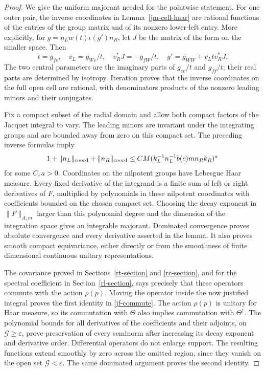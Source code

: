 \begin{proof}
We give the uniform majorant needed for the pointwise statement.
For one outer pair, the inverse coordinates in
Lemma~\ref{jm-cell-haar} are rational functions of the entries
of the group matrix and of its nonzero lower-left entry.
More explicitly, for
\(g=n_Lw(t)\iota(g')n_R\), let \(J\) be the matrix of
the form on the smaller space.  Then
\[
 t=g_{fe},\quad v_L=g_{We}/t,\quad
 v_R^*J=-g_{fW}/t,\quad
 g'=g_{WW}+v_Lt v_R^*J.
\]
The two central parameters are the imaginary parts of
\(g_{ee}/t\) and \(g_{ff}/t\); their real parts are
determined by isotropy.  Iteration proves that the inverse
coordinates on the full open cell are rational, with
denominators products of the nonzero leading minors and
their conjugates.

Fix a compact subset of the radial domain and allow both
compact factors of the Jacquet integral to vary.  The leading
minors are invariant under the integrating groups and are
bounded away from zero on this compact set.  The preceding
inverse formulas imply
\[
  1+\|n_L\|_{\rm coord}+\|n_R\|_{\rm coord}
              \leq C M(k_L^{-1}n_L^{-1}b(c)m n_Rk_R)^a
\]
for some \(C,a>0\).  Coordinates on the nilpotent groups
have Lebesgue Haar measure.  Every fixed derivative of the
integrand is a finite sum of left or right derivatives of
\(F\), multiplied by polynomials in these nilpotent
coordinates with coefficients bounded on the chosen compact
set.  Choosing the decay exponent in \(\|F\|_{A,m}\)
larger than this polynomial degree and the dimension of the
integration space gives an integrable majorant.  Dominated
convergence proves absolute convergence and every derivative
asserted in the lemma.  It also proves smooth compact
equivariance, either directly or from the smoothness of
finite dimensional continuous unitary representations.

The covariance proved in Sections~\ref{rt-section} and
\ref{rc-section}, and for the spectral coefficient in
Section~\ref{rl-section}, says precisely that these operators
commute with the action \(\rho(p)\).  Moving the operator
inside the now justified integral proves the first identity
in \eqref{jf-commute}.  The action \(\rho(p)\) is unitary
for Haar measure, so its commutation with \(\Theta\)
also implies commutation with \(\Theta^\dagger\).
The polynomial bounds for all derivatives of the coefficients
and their adjoints, on \(\mathcal G\geq\varepsilon\),
prove preservation of every seminorm after increasing its
decay exponent and derivative order.  Differential operators
do not enlarge support.  The resulting functions extend
smoothly by zero across the omitted region, since they vanish
on the open set \(\mathcal G<\varepsilon\).
The same dominated argument proves the second identity.
\end{proof}

